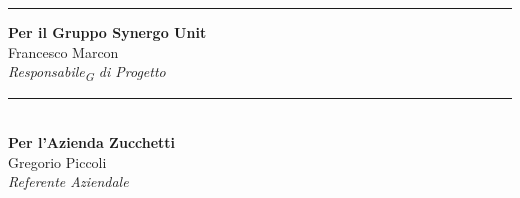 \begin{minipage}[c]{0.45\textwidth}

\begin{center}

\rule{6cm}{0.4pt}

\vspace{0.2cm}

\textbf{Per il Gruppo Synergo Unit} \\
Francesco Marcon \\
\textit{Responsabile\textsubscript{G} di Progetto}
\end{center}
\end{minipage}
\hfill
\begin{minipage}[c]{0.45\textwidth}
\begin{center}
\rule{6cm}{0.4pt} \\
\vspace{0.2cm}
\textbf{Per l'Azienda Zucchetti} \\
Gregorio Piccoli \\
\textit{Referente Aziendale}
\end{center}
\end{minipage}


\vspace{2cm}
